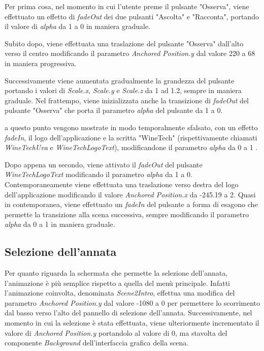 Per prima cosa, nel momento in cui l'utente preme il pulsante "Osserva", viene effettuato un effetto di \textit{fadeOut} dei due pulsanti "Ascolta" e "Racconta", portando il valore di \textit{alpha} da 1 a 0 in maniera graduale. 

Subito dopo, viene effettuata una traslazione del pulsante "Osserva" dall'alto verso il centro modificando il parametro \textit{Anchored Position.y} dal valore 220 a 68 in maniera progressiva. 

Successivamente viene aumentata gradualmente la grandezza del pulsante portando i valori di \textit{Scale.x}, \textit{Scale.y} e \textit{Scale.z} da 1 ad 1.2, sempre in maniera graduale. Nel frattempo, viene inizializzata anche la transizione di \textit{fadeOut} del pulsante "Osserva" che porta il parametro \textit{alpha} del pulsante da 1 a 0. 

a questo punto vengono mostrate in modo temporalmente sfalsato, con un effetto \textit{fadeIn}, il logo dell'applicazione e la scritta "WineTech" (rispettivamente chiamati \textit{WineTechUva} e \textit{WineTechLogoText}), modificandone il parametro \textit{alpha} da 0 a 1 . 

Dopo appena un secondo, viene attivato il \textit{fadeOut} del pulsante \textit{WineTechLogoText} modificando il parametro \textit{alpha} da 1 a 0. Contemporaneamente viene effettuata una traslazione verso destra del logo dell'applicazione modificando il valore \textit{Anchored Position.x} da -245.19 a 2. Quasi in contemporanea, viene effettuato un \textit{fadeIn} del pulsante a forma di esagono che permette la transizione alla scena successiva, sempre modificando il parametro \textit{alpha} da 0 a 1 in maniera graduale.

\subsection{Selezione dell'annata}

Per quanto riguarda la schermata che permette la selezione dell'annata, l'animazione è più semplice rispetto a quella del menù principale. Infatti l'animazione coinvolta, denominata \textit{Scene2Intro}, effettua una modifica del parametro \textit{Anchored Position.y} dal valore -1080 a 0 per permettere lo scorrimento dal basso verso l'alto del pannello di selezione dell'annata. Successivamente, nel momento in cui la selezione è stata effettuata, viene ulteriormente incrementato il valore di \textit{Anchored Position.y} portandolo al valore di 0, ma stavolta del componente \textit{Background} dell'interfaccia grafica della scena.


